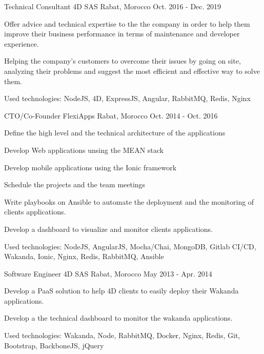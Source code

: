 \begin{cventries}
  \cventry
    {Technical Consultant} %
    {4D SAS} %
    {Rabat, Morocco} %
    {Oct. 2016 - Dec. 2019} %
    {
      \begin{cvitems} %
        \item {Offer advice and technical expertise to the the company in order to help them improve their business performance in terms of maintenance and developer experience.}
        \item {Helping the company's customers to overcome their issues by going on site, analyzing their problems and suggest the most efficient and effective way to solve them.}
        \item {Used technologies: NodeJS, 4D, ExpressJS, Angular, RabbitMQ, Redis, Nginx}
      \end{cvitems}
    }

  \cventry
    {CTO/Co-Founder}
    {FlexiApps}
    {Rabat, Morocco}
    {Oct. 2014 - Oct. 2016}
    {
      \begin{cvitems}
        \item {Define the high level and the technical architecture of the applications}
        \item {Develop Web applications unsing the MEAN stack}
        \item {Develop mobile applications using the Ionic framework}
        \item {Schedule the projects and the team meetings}
        \item {Write playbooks on Ansible to automate the deployment and the monitoring of clients applications.}
        \item {Develop a dashboard to visualize and monitor clients applications.}
        \item {Used technologies: NodeJS, AngularJS, Mocha/Chai, MongoDB, Gitlab CI/CD, Wakanda, Ionic, Nginx, Redis, RabbitMQ, Ansible}
      \end{cvitems}
    }

  \cventry
    {Software Engineer} %
    {4D SAS} %
    {Rabat, Morocco} %
    {May 2013 - Apr. 2014} %
    {
      \begin{cvitems} %
        \item {Develop a PaaS solution to help 4D clients to easily deploy their Wakanda applications.}
        \item {Develop a the technical dashboard to monitor the wakanda applications.}
        \item {Used technologies: Wakanda, Node, RabbitMQ, Docker, Nginx, Redis, Git, Bootstrap, BackboneJS, jQuery}
      \end{cvitems}
    }


\end{cventries}
